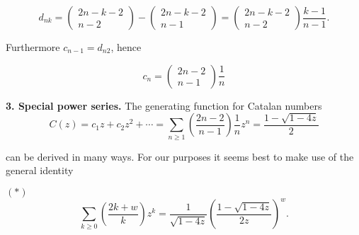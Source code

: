 \documentclass[10pt]{article}
\begin{document}

\begin{equation*}
d_{nk} = \left( \begin{array}{c} 2n - k -2 \\ n - 2 \end{array} \right) - \left( \begin{array}{c} 2n - k -2 \\ n - 1 \end{array} \right)  =  \left( \begin{array}{c} 2n - k -2 \\ n - 2 \end{array} \right) \frac{k-1}{n-1} .
\end{equation*}

\begin{flushleft}
Furthermore $c_{n-1} = d_{n2}$, hence 
\end{flushleft}


\begin{equation*}
c_{n} = \left( \begin{array}{c} 2n -2 \\ n - 1 \end{array} \right) \! \frac{1}{n}
\end{equation*}

\label{3. Special power series.}
\textbf{3. Special power series.} The generating function for Catalan numbers
\begin{equation*}
C(z) = c_{1}z + c_{2}z^{2} + \cdots  = \sum_{n \geq 1} \left( \frac{2n-2}{n-1} \right) \frac{1}{n}z^{n} = 
\frac{ 1- \sqrt{ 1 - 4z}}{2}
\end{equation*}

can be derived in many ways. For our purposes it seems best to make use of the general identity 


\label{eq:star1}$\boldsymbol{ (\ast) }$ 
\begin{equation*}
 \sum_{k \geq 0} \left( \frac{2k + w}{k} \right) z^{k} = \frac{1}{\sqrt{1-4z}} \left( \frac{1 - \sqrt{1-4z}}{2z} \right)^{w}.
\end{equation*}
\end{document}
